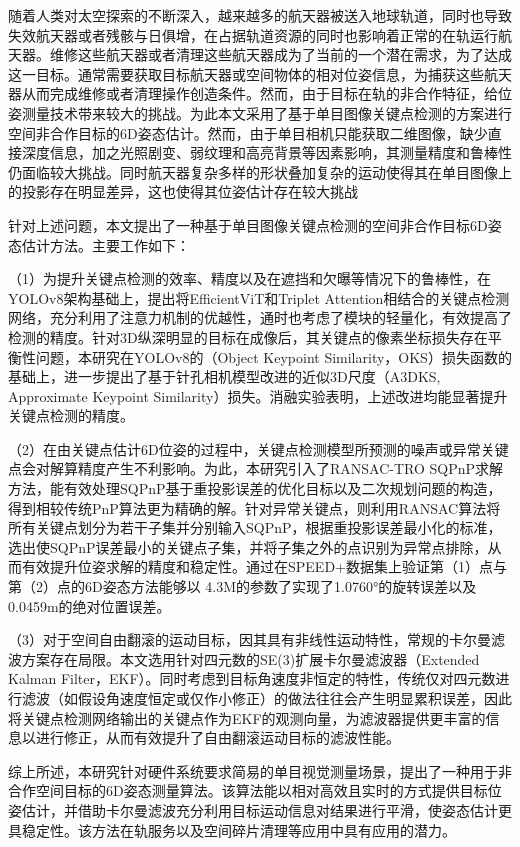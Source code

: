 随着人类对太空探索的不断深入，越来越多的航天器被送入地球轨道，同时也导致失效航天器或者残骸与日俱增，在占据轨道资源的同时也影响着正常的在轨运行航天器。维修这些航天器或者清理这些航天器成为了当前的一个潜在需求，为了达成这一目标。通常需要获取目标航天器或空间物体的相对位姿信息，为捕获这些航天器从而完成维修或者清理操作创造条件。然而，由于目标在轨的非合作特征，给位姿测量技术带来较大的挑战。为此本文采用了基于单目图像关键点检测的方案进行空间非合作目标的6D姿态估计。然而，由于单目相机只能获取二维图像，缺少直接深度信息，加之光照剧变、弱纹理和高亮背景等因素影响，其测量精度和鲁棒性仍面临较大挑战。同时航天器复杂多样的形状叠加复杂的运动使得其在单目图像上的投影存在明显差异，这也使得其位姿估计存在较大挑战

针对上述问题，本文提出了一种基于单目图像关键点检测的空间非合作目标6D姿态估计方法。主要工作如下：

	
（1）为提升关键点检测的效率、精度以及在遮挡和欠曝等情况下的鲁棒性，在YOLOv8架构基础上，提出将EfficientViT和Triplet Attention相结合的关键点检测网络，充分利用了注意力机制的优越性，通时也考虑了模块的轻量化，有效提高了检测的精度。针对3D纵深明显的目标在成像后，其关键点的像素坐标损失存在平衡性问题，本研究在YOLOv8的（Object Keypoint Similarity，OKS）损失函数的基础上，进一步提出了基于针孔相机模型改进的近似3D尺度（A3DKS, Approximate Keypoint Similarity）损失。消融实验表明，上述改进均能显著提升关键点检测的精度。

（2）在由关键点估计6D位姿的过程中，关键点检测模型所预测的噪声或异常关键点会对解算精度产生不利影响。为此，本研究引入了RANSAC-TRO SQPnP求解方法，能有效处理SQPnP基于重投影误差的优化目标以及二次规划问题的构造，得到相较传统PnP算法更为精确的解。针对异常关键点，则利用RANSAC算法将所有关键点划分为若干子集并分别输入SQPnP，根据重投影误差最小化的标准，选出使SQPnP误差最小的关键点子集，并将子集之外的点识别为异常点排除，从而有效提升位姿求解的精度和稳定性。通过在SPEED+数据集上验证第（1）点与第（2）点的6D姿态方法能够以	4.3M的参数了实现了1.0760°的旋转误差以及0.0459m的绝对位置误差。

（3）对于空间自由翻滚的运动目标，因其具有非线性运动特性，常规的卡尔曼滤波方案存在局限。本文选用针对四元数的SE(3)扩展卡尔曼滤波器（Extended Kalman Filter，EKF）。同时考虑到目标角速度非恒定的特性，传统仅对四元数进行滤波（如假设角速度恒定或仅作小修正）的做法往往会产生明显累积误差，因此将关键点检测网络输出的关键点作为EKF的观测向量，为滤波器提供更丰富的信息以进行修正，从而有效提升了自由翻滚运动目标的滤波性能。

综上所述，本研究针对硬件系统要求简易的单目视觉测量场景，提出了一种用于非合作空间目标的6D姿态测量算法。该算法能以相对高效且实时的方式提供目标位姿估计，并借助卡尔曼滤波充分利用目标运动信息对结果进行平滑，使姿态估计更具稳定性。该方法在轨服务以及空间碎片清理等应用中具有应用的潜力。

